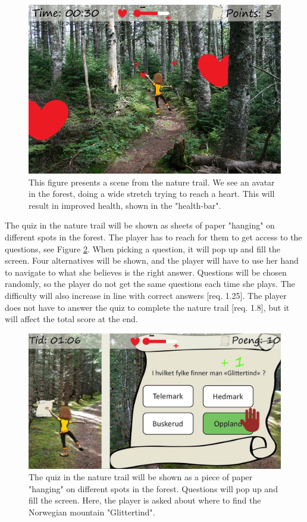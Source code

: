 \begin{figure} [H]
\centering
\includegraphics[scale=0.27]{game1engelsk.jpg}
\caption[Nature trail - stretching]{This figure presents a scene from the nature trail. We see an avatar in the forest, doing a wide stretch trying to reach a heart. This will result in improved health, shown in the "health-bar".}
\label{fig:hearts}
\end{figure}

The quiz in the nature trail will be shown as sheets of paper "hanging" on different spots in the forest. The player has to reach for them to get access to the questions, see Figure \ref{fig:quiz}. When picking a question, it will pop up and fill the screen. Four alternatives will be shown, and the player will have to use her hand to navigate to what she believes is the right answer. Questions will be chosen randomly, so the player do not get the same questions each time she plays. The difficulty will also increase in line with correct answers [req. 1.25]. The player does not have to answer the quiz to complete the nature trail [req. 1.8], but it will affect the total score at the end. 

\begin{figure} [H]
\centering
\includegraphics[scale=0.4]{quiz.jpg}
\caption[Nature trail - quiz]{The quiz in the nature trail will be shown as a piece of paper "hanging" on different spots in the forest. Questions will pop up and fill the screen. Here, the player is asked about where to find the Norwegian mountain "Glittertind".}
\label{fig:quiz}
\end{figure} 


